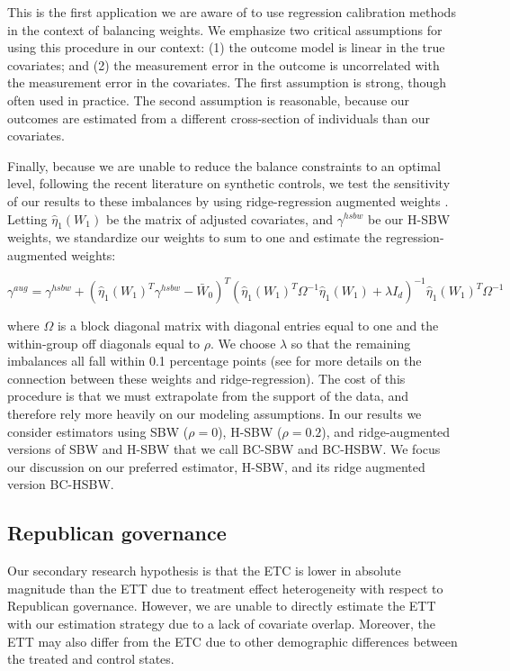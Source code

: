 \documentclass[aoas]{imsart}
\theoremstyle{plain}
\theoremstyle{remark}
\begin{document}
This is the first application we are aware of to use regression calibration methods in the context of balancing weights. We emphasize two critical assumptions for using this procedure in our context: (1) the outcome model is linear in the true covariates; and (2) the measurement error in the outcome is uncorrelated with the measurement error in the covariates. The first assumption is strong, though often used in practice. The second assumption is reasonable, because our outcomes are estimated from a different cross-section of individuals than our covariates. 

Finally, because we are unable to reduce the balance constraints to an optimal level, following the recent literature on synthetic controls, we test the sensitivity of our results to these imbalances by using ridge-regression augmented weights \cite{ben2018augmented}. Letting $\hat{\eta}_1(W_1)$ be the matrix of adjusted covariates, and $\gamma^{hsbw}$ be our H-SBW weights, we standardize our weights to sum to one and estimate the regression-augmented weights:

\begin{equation}
\gamma^{aug} = \gamma^{hsbw} + (\hat{\eta}_1(W_1)^T\gamma^{hsbw} - \bar{W}_0)^T(\hat{\eta}_1(W_1)^T\Omega^{-1}\hat{\eta}_1(W_1) + \lambda I_d)^{-1}\hat{\eta}_1(W_1)^T\Omega^{-1}
\end{equation}

where $\Omega$ is a block diagonal matrix with diagonal entries equal to one and the within-group off diagonals equal to $\rho$. We choose $\lambda$ so that the remaining imbalances all fall within 0.1 percentage points (see \cite{ben2018augmented} for more details on the connection between these weights and ridge-regression). The cost of this procedure is that we must extrapolate from the support of the data, and therefore rely more heavily on our modeling assumptions. In our results we consider estimators using SBW ($\rho = 0$), H-SBW ($\rho = 0.2$), and ridge-augmented versions of SBW and H-SBW that we call BC-SBW and BC-HSBW. We focus our discussion on our preferred estimator, H-SBW, and its ridge augmented version BC-HSBW. 

\subsection{Republican governance}

Our secondary research hypothesis is that the ETC is lower in absolute magnitude than the ETT due to treatment effect heterogeneity with respect to Republican governance. However, we are unable to directly estimate the ETT with our estimation strategy due to a lack of covariate overlap. Moreover, the ETT may also differ from the ETC due to other demographic differences between the treated and control states. 
\end{document}
